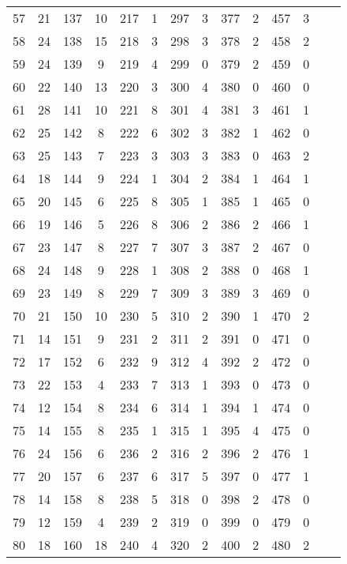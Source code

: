 \begin{table}
\begin{tabular}{c|c||c|c||c|c||c|c||c|c||c|c||c|c}
 57 & 21  & 137 & 10 & 217 &  1 & 297 &  3 & 377 & 2 & 457 & 3 &     &  \\
 58 & 24  & 138 & 15 & 218 &  3 & 298 &  3 & 378 & 2 & 458 & 2 &     &  \\
 59 & 24  & 139 &  9 & 219 &  4 & 299 &  0 & 379 & 2 & 459 & 0 &     &  \\
 60 & 22  & 140 & 13 & 220 &  3 & 300 &  4 & 380 & 0 & 460 & 0 &     &  \\
 61 & 28  & 141 & 10 & 221 &  8 & 301 &  4 & 381 & 3 & 461 & 1 &     &  \\
 62 & 25  & 142 &  8 & 222 &  6 & 302 &  3 & 382 & 1 & 462 & 0 &     &  \\
 63 & 25  & 143 &  7 & 223 &  3 & 303 &  3 & 383 & 0 & 463 & 2 &     &  \\
 64 & 18  & 144 &  9 & 224 &  1 & 304 &  2 & 384 & 1 & 464 & 1 &     &  \\
 65 & 20  & 145 &  6 & 225 &  8 & 305 &  1 & 385 & 1 & 465 & 0 &     &  \\
 66 & 19  & 146 &  5 & 226 &  8 & 306 &  2 & 386 & 2 & 466 & 1 &     &  \\
 67 & 23  & 147 &  8 & 227 &  7 & 307 &  3 & 387 & 2 & 467 & 0 &     &  \\
 68 & 24  & 148 &  9 & 228 &  1 & 308 &  2 & 388 & 0 & 468 & 1 &     &  \\
 69 & 23  & 149 &  8 & 229 &  7 & 309 &  3 & 389 & 3 & 469 & 0 &     &  \\
 70 & 21  & 150 & 10 & 230 &  5 & 310 &  2 & 390 & 1 & 470 & 2 &     &  \\
 71 & 14  & 151 &  9 & 231 &  2 & 311 &  2 & 391 & 0 & 471 & 0 &     &  \\
 72 & 17  & 152 &  6 & 232 &  9 & 312 &  4 & 392 & 2 & 472 & 0 &     &  \\
 73 & 22  & 153 &  4 & 233 &  7 & 313 &  1 & 393 & 0 & 473 & 0 &     &  \\
 74 & 12  & 154 &  8 & 234 &  6 & 314 &  1 & 394 & 1 & 474 & 0 &     &  \\
 75 & 14  & 155 &  8 & 235 &  1 & 315 &  1 & 395 & 4 & 475 & 0 &     &  \\
 76 & 24  & 156 &  6 & 236 &  2 & 316 &  2 & 396 & 2 & 476 & 1 &     &  \\
 77 & 20  & 157 &  6 & 237 &  6 & 317 &  5 & 397 & 0 & 477 & 1 &     &  \\
 78 & 14  & 158 &  8 & 238 &  5 & 318 &  0 & 398 & 2 & 478 & 0 &     &  \\
 79 & 12  & 159 &  4 & 239 &  2 & 319 &  0 & 399 & 0 & 479 & 0 &     &  \\
 80 & 18  & 160 & 18 & 240 &  4 & 320 &  2 & 400 & 2 & 480 & 2 &     &  \\
 \bottomrule
 \end{tabular}
 \end{table}
